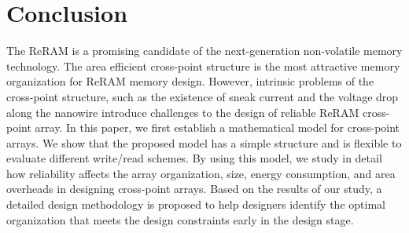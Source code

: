 \vspace{10pt}
\section{Conclusion}\label{sec:conclusion}

The ReRAM is a promising candidate of the next-generation non-volatile memory technology. The area efficient cross-point structure is the most attractive memory organization for ReRAM memory design. However, intrinsic problems of the cross-point structure, such as the existence of sneak current and the voltage drop along the nanowire introduce challenges to the design of reliable ReRAM cross-point array. In this paper, we first establish a mathematical model for cross-point arrays. We show that the proposed model has a simple structure and is flexible to evaluate different write/read schemes. By using this model, we study in detail how reliability affects the array organization, size, energy consumption, and area overheads in designing cross-point arrays. Based on the results of our study, a detailed design methodology is proposed to help designers identify the optimal organization that meets the design constraints early in the design stage.

